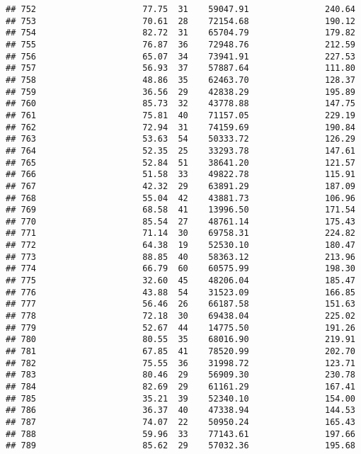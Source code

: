\documentclass[
]{article}
\begin{document}
\begin{verbatim}
## 752                     77.75  31    59047.91               240.64
## 753                     70.61  28    72154.68               190.12
## 754                     82.72  31    65704.79               179.82
## 755                     76.87  36    72948.76               212.59
## 756                     65.07  34    73941.91               227.53
## 757                     56.93  37    57887.64               111.80
## 758                     48.86  35    62463.70               128.37
## 759                     36.56  29    42838.29               195.89
## 760                     85.73  32    43778.88               147.75
## 761                     75.81  40    71157.05               229.19
## 762                     72.94  31    74159.69               190.84
## 763                     53.63  54    50333.72               126.29
## 764                     52.35  25    33293.78               147.61
## 765                     52.84  51    38641.20               121.57
## 766                     51.58  33    49822.78               115.91
## 767                     42.32  29    63891.29               187.09
## 768                     55.04  42    43881.73               106.96
## 769                     68.58  41    13996.50               171.54
## 770                     85.54  27    48761.14               175.43
## 771                     71.14  30    69758.31               224.82
## 772                     64.38  19    52530.10               180.47
## 773                     88.85  40    58363.12               213.96
## 774                     66.79  60    60575.99               198.30
## 775                     32.60  45    48206.04               185.47
## 776                     43.88  54    31523.09               166.85
## 777                     56.46  26    66187.58               151.63
## 778                     72.18  30    69438.04               225.02
## 779                     52.67  44    14775.50               191.26
## 780                     80.55  35    68016.90               219.91
## 781                     67.85  41    78520.99               202.70
## 782                     75.55  36    31998.72               123.71
## 783                     80.46  29    56909.30               230.78
## 784                     82.69  29    61161.29               167.41
## 785                     35.21  39    52340.10               154.00
## 786                     36.37  40    47338.94               144.53
## 787                     74.07  22    50950.24               165.43
## 788                     59.96  33    77143.61               197.66
## 789                     85.62  29    57032.36               195.68

\end{verbatim}
\end{document}
